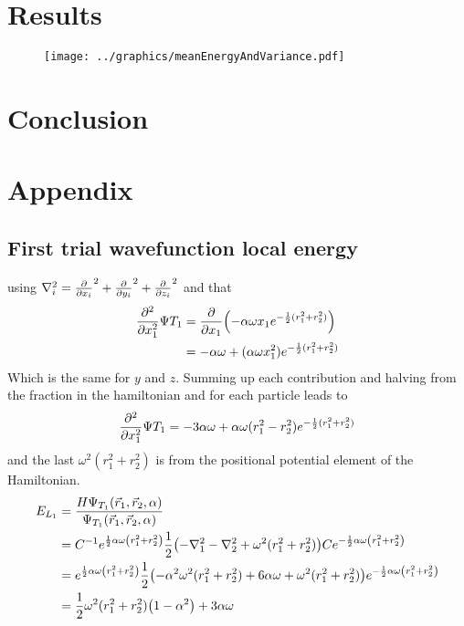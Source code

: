 \documentclass[10pt]{revtex4-1}
\begin{document}
\section{Results}


\begin{figure}[hbtp]
\texttt{[image: ../graphics/meanEnergyAndVariance.pdf]}
\caption{}
\end{figure}

\section{Conclusion}

\section{Appendix}

\subsection{First trial wavefunction local energy}

using $\nabla_i^2 = \pdv{x_i}^2 + \pdv{y_i}^2 + \pdv{z_i}^2$ and that
\begin{align}
    \pdv[2]{x_1} \Psi{T_1} &= \pdv{x_1}\qty( -\alpha \omega x_1 e^{-\frac{1}{2}(r_1^2 + r_2^2)} )\nonumber\\
                                &= -\alpha\omega + (\alpha\omega x_1^2)e^{-\frac{1}{2}(r_1^2 + r_2^2)}
\end{align}
Which is the same for $y$ and $z$. Summing up each contribution and halving from the fraction in the hamiltonian and for each particle leads to
\begin{align}
    \pdv[2]{x_1} \Psi{T_1} = -3\alpha\omega + \alpha\omega (r_1^2 - r_2^2)e^{-\frac{1}{2}(r_1^2 + r_2^2)}
\end{align}
and the last $\omega^2 ( r_1^2 + r_2^2 )$ is from the positional potential element of the Hamiltonian.
\begin{align}
    E_{L_1} &= \frac{H \Psi_{T_1} \qty(\vec{r}_1, \vec{r}_2, \alpha )}{\Psi_{T_1} \qty(\vec{r}_1, \vec{r}_2, \alpha )}\nonumber \\
        &= C^{-1} e^{\frac{1}{2}\alpha \omega \qty(r_{1}^{2} + r_{2}^{2})} \frac{1}{2}\qty(-\nabla_1^2 -\nabla_2^2 + \omega^2(r_1^2 + r_2^2))
          C e^{-\frac{1}{2} \alpha \omega \qty(r_1^2 + r_2^2)} \nonumber \\
        &= e^{\frac{1}{2}\alpha \omega \qty(r_{1}^{2} + r_{2}^{2})}
            \frac{1}{2}\qty(-\alpha^2 \omega^2 (r_1^2 + r_2^2) + 6\alpha \omega + \omega^2 (r_1^2 + r_2^2))
            e^{-\frac{1}{2} \alpha \omega \qty(r_1^2 + r_2^2)} \nonumber \\
        &= \frac{1}{2}\omega^2 (r_1^2 + r_2^2)\qty(1 -\alpha^2 ) + 3\alpha \omega \label{eq:naiveLocalEnergyExpanded}
\end{align}
\end{document}
